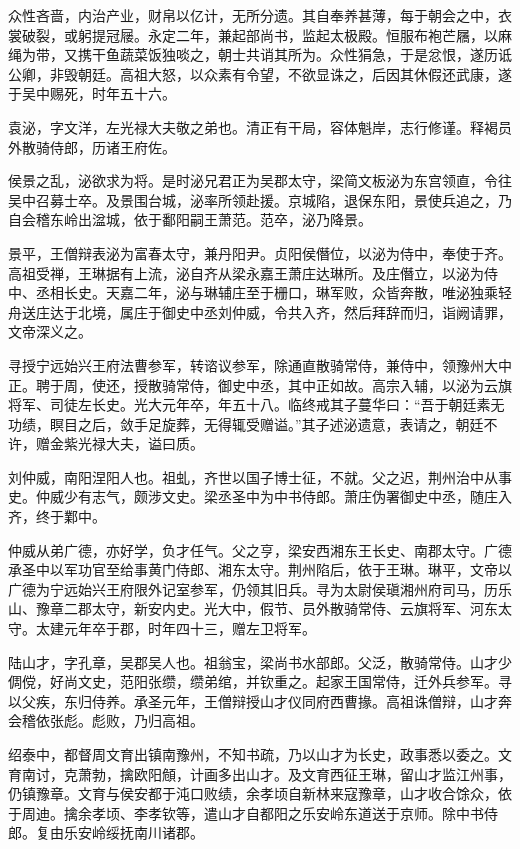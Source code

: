 \documentclass[]{article}
\begin{document}
众性吝啬，内治产业，财帛以亿计，无所分遗。其自奉养甚薄，每于朝会之中，衣裳破裂，或躬提冠屦。永定二年，兼起部尚书，监起太极殿。恒服布袍芒屩，以麻绳为带，又携干鱼蔬菜饭独啖之，朝士共诮其所为。众性狷急，于是忿恨，遂历诋公卿，非毁朝廷。高祖大怒，以众素有令望，不欲显诛之，后因其休假还武康，遂于吴中赐死，时年五十六。

袁泌，字文洋，左光禄大夫敬之弟也。清正有干局，容体魁岸，志行修谨。释褐员外散骑侍郎，历诸王府佐。

侯景之乱，泌欲求为将。是时泌兄君正为吴郡太守，梁简文板泌为东宫领直，令往吴中召募士卒。及景围台城，泌率所领赴援。京城陷，退保东阳，景使兵追之，乃自会稽东岭出湓城，依于鄱阳嗣王萧范。范卒，泌乃降景。

景平，王僧辩表泌为富春太守，兼丹阳尹。贞阳侯僭位，以泌为侍中，奉使于齐。高祖受禅，王琳据有上流，泌自齐从梁永嘉王萧庄达琳所。及庄僭立，以泌为侍中、丞相长史。天嘉二年，泌与琳辅庄至于栅口，琳军败，众皆奔散，唯泌独乘轻舟送庄达于北境，属庄于御史中丞刘仲威，令共入齐，然后拜辞而归，诣阙请罪，文帝深义之。

寻授宁远始兴王府法曹参军，转谘议参军，除通直散骑常侍，兼侍中，领豫州大中正。聘于周，使还，授散骑常侍，御史中丞，其中正如故。高宗入辅，以泌为云旗将军、司徒左长史。光大元年卒，年五十八。临终戒其子蔓华曰：``吾于朝廷素无功绩，瞑目之后，敛手足旋葬，无得辄受赠谥。''其子述泌遗意，表请之，朝廷不许，赠金紫光禄大夫，谥曰质。

刘仲威，南阳涅阳人也。祖虬，齐世以国子博士征，不就。父之迟，荆州治中从事史。仲威少有志气，颇涉文史。梁丞圣中为中书侍郎。萧庄伪署御史中丞，随庄入齐，终于鄴中。

仲威从弟广德，亦好学，负才任气。父之亨，梁安西湘东王长史、南郡太守。广德承圣中以军功官至给事黄门侍郎、湘东太守。荆州陷后，依于王琳。琳平，文帝以广德为宁远始兴王府限外记室参军，仍领其旧兵。寻为太尉侯瑱湘州府司马，历乐山、豫章二郡太守，新安内史。光大中，假节、员外散骑常侍、云旗将军、河东太守。太建元年卒于郡，时年四十三，赠左卫将军。

陆山才，字孔章，吴郡吴人也。祖翁宝，梁尚书水部郎。父泛，散骑常侍。山才少倜傥，好尚文史，范阳张缵，缵弟绾，并钦重之。起家王国常侍，迁外兵参军。寻以父疾，东归侍养。承圣元年，王僧辩授山才仪同府西曹掾。高祖诛僧辩，山才奔会稽依张彪。彪败，乃归高祖。

绍泰中，都督周文育出镇南豫州，不知书疏，乃以山才为长史，政事悉以委之。文育南讨，克萧勃，擒欧阳頠，计画多出山才。及文育西征王琳，留山才监江州事，仍镇豫章。文育与侯安都于沌口败绩，余孝顷自新林来寇豫章，山才收合馀众，依于周迪。擒余孝顷、李孝钦等，遣山才自都阳之乐安岭东道送于京师。除中书侍郎。复由乐安岭绥抚南川诸郡。
\end{document}
